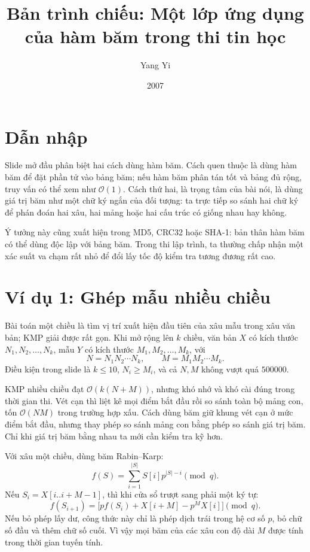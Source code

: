 \documentclass[11pt]{article}
\title{Bản trình chiếu: Một lớp ứng dụng của hàm băm trong thi tin học}
\author{Yang Yi}
\date{2007}
\newcommand{\Oh}{\mathcal{O}}
\begin{document}
\maketitle


\section{Dẫn nhập}

Slide mở đầu phân biệt hai cách dùng hàm băm. Cách quen thuộc là dùng hàm
băm để đặt phần tử vào bảng băm; nếu hàm băm phân tán tốt và bảng đủ rộng,
truy vấn có thể xem như \(\Oh(1)\). Cách thứ hai, là trọng tâm của bài nói,
là dùng giá trị băm như một chữ ký ngắn của đối tượng: ta trực tiếp so sánh
hai chữ ký để phán đoán hai xâu, hai mảng hoặc hai cấu trúc có giống nhau
hay không.

Ý tưởng này cũng xuất hiện trong MD5, CRC32 hoặc SHA-1: bản thân hàm băm có
thể dùng độc lập với bảng băm. Trong thi lập trình, ta thường chấp nhận một
xác suất va chạm rất nhỏ để đổi lấy tốc độ kiểm tra tương đương rất cao.

\section{Ví dụ 1: Ghép mẫu nhiều chiều}

Bài toán một chiều là tìm vị trí xuất hiện đầu tiên của xâu mẫu trong xâu văn
bản; KMP giải được rất gọn. Khi mở rộng lên \(k\) chiều, văn bản \(X\) có
kích thước \(N_1,N_2,\ldots,N_k\), mẫu \(Y\) có kích thước
\(M_1,M_2,\ldots,M_k\), với
\[
  N=N_1N_2\cdots N_k,\qquad M=M_1M_2\cdots M_k.
\]
Điều kiện trong slide là \(k\le 10\), \(N_i\ge M_i\), và cả \(N,M\) không
vượt quá \(500000\).

KMP nhiều chiều đạt \(\Oh(k(N+M))\), nhưng khó nhớ và khó cài đúng trong thời
gian thi. Vét cạn thì liệt kê mọi điểm bắt đầu rồi so sánh toàn bộ mảng con,
tốn \(\Oh(NM)\) trong trường hợp xấu. Cách dùng băm giữ khung vét cạn ở mức
điểm bắt đầu, nhưng thay phép so sánh mảng con bằng phép so sánh giá trị băm.
Chỉ khi giá trị băm bằng nhau ta mới cần kiểm tra kỹ hơn.

Với xâu một chiều, dùng băm Rabin--Karp:
\[
  f(S)=\sum_{i=1}^{|S|} S[i]p^{|S|-i}\pmod q.
\]
Nếu \(S_i=X[i..i+M-1]\), thì khi cửa sổ trượt sang phải một ký tự:
\[
  f(S_{i+1})=\bigl[p f(S_i)+X[i+M]-p^M X[i]\bigr]\pmod q.
\]
Nếu bỏ phép lấy dư, công thức này chỉ là phép dịch trái trong hệ cơ số \(p\),
bỏ chữ số đầu và thêm chữ số cuối. Vì vậy mọi băm của các xâu con độ dài
\(M\) được tính trong thời gian tuyến tính.
\end{document}
